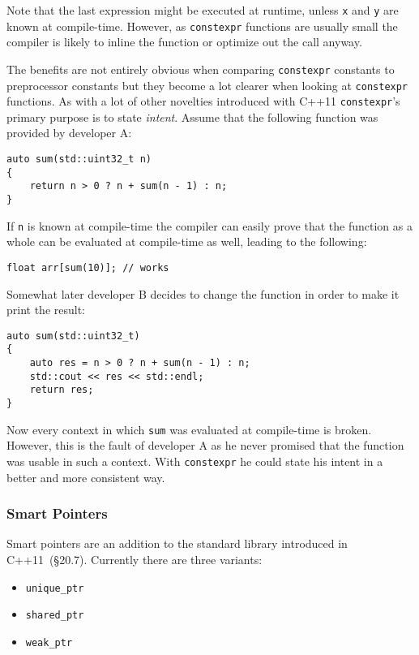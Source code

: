 Note that the last expression might be executed at runtime, unless \texttt{x} and \texttt{y} are known at compile-time. However, as \texttt{constexpr} functions are usually small the compiler is likely to inline the function or optimize out the call anyway.

The benefits are not entirely obvious when comparing \texttt{constexpr} constants to preprocessor constants but they become a lot clearer when looking at \texttt{constexpr} functions. As with a lot of other novelties introduced with C++11 \texttt{constexpr}'s primary purpose is to state \textit{intent}. Assume that the following function was provided by developer A:

\begin{lstlisting}
auto sum(std::uint32_t n)
{
    return n > 0 ? n + sum(n - 1) : n;
}
\end{lstlisting}

If \texttt{n} is known at compile-time the compiler can easily prove that the function as a whole can be evaluated at compile-time as well, leading to the following:

\begin{lstlisting}
float arr[sum(10)]; // works
\end{lstlisting}

Somewhat later developer B decides to change the function in order to make it print the result:

\begin{lstlisting}
auto sum(std::uint32_t)
{
    auto res = n > 0 ? n + sum(n - 1) : n;
    std::cout << res << std::endl;
    return res;
}
\end{lstlisting}

Now every context in which \texttt{sum} was evaluated at compile-time is broken. However, this is the fault of developer A as he never promised that the function was usable in such a context. With \texttt{constexpr} he could state his intent in a better and more consistent way.

\subsubsection{Smart Pointers}\label{vec_add:smart_ptr}

Smart pointers are an addition to the standard library introduced in C++11~\cite{cpp11std}(§20.7). Currently there are three variants:
\begin{itemize}
\item \texttt{unique\_ptr}
\item \texttt{shared\_ptr}
\item \texttt{weak\_ptr}
\end{itemize}

